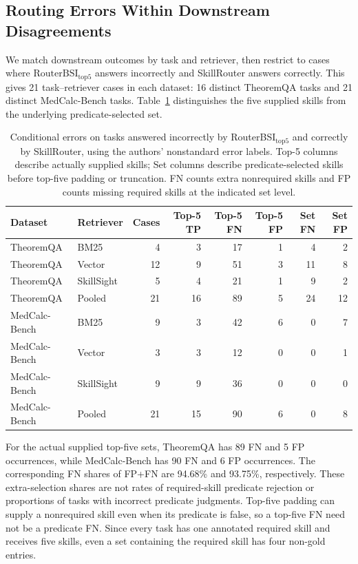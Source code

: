 \subsection{Routing Errors Within Downstream Disagreements}
We match downstream outcomes by task and retriever, then restrict to cases where $\mathrm{RouterBSI}_{\mathrm{top}5}$ answers incorrectly and SkillRouter answers correctly. This gives 21 task--retriever cases in each dataset: 16 distinct TheoremQA tasks and 21 distinct MedCalc-Bench tasks. Table~\ref{tab:app-conditional-errors} distinguishes the five supplied skills from the underlying predicate-selected set.

\begin{table}[t]
\centering
\small
\begin{tabular}{llrrrrrr}
\toprule
Dataset & Retriever & Cases & Top-5 TP & Top-5 FN & Top-5 FP & Set FN & Set FP \\
\midrule
TheoremQA & BM25 & 4 & 3 & 17 & 1 & 4 & 2 \\
TheoremQA & Vector & 12 & 9 & 51 & 3 & 11 & 8 \\
TheoremQA & SkillSight & 5 & 4 & 21 & 1 & 9 & 2 \\
TheoremQA & Pooled & 21 & 16 & 89 & 5 & 24 & 12 \\
MedCalc-Bench & BM25 & 9 & 3 & 42 & 6 & 0 & 7 \\
MedCalc-Bench & Vector & 3 & 3 & 12 & 0 & 0 & 1 \\
MedCalc-Bench & SkillSight & 9 & 9 & 36 & 0 & 0 & 0 \\
MedCalc-Bench & Pooled & 21 & 15 & 90 & 6 & 0 & 8 \\
\bottomrule
\end{tabular}
\caption{Conditional errors on tasks answered incorrectly by RouterBSI$_{\mathrm{top}5}$ and correctly by SkillRouter, using the authors' nonstandard error labels. Top-5 columns describe actually supplied skills; Set columns describe predicate-selected skills before top-five padding or truncation. FN counts extra nonrequired skills and FP counts missing required skills at the indicated set level.}
\label{tab:app-conditional-errors}
\end{table}

For the actual supplied top-five sets, TheoremQA has 89 FN and 5 FP occurrences, while MedCalc-Bench has 90 FN and 6 FP occurrences. The corresponding FN shares of FP+FN are 94.68\% and 93.75\%, respectively. These extra-selection shares are not rates of required-skill predicate rejection or proportions of tasks with incorrect predicate judgments. Top-five padding can supply a nonrequired skill even when its predicate is false, so a top-five FN need not be a predicate FN. Since every task has one annotated required skill and receives five skills, even a set containing the required skill has four non-gold entries.

